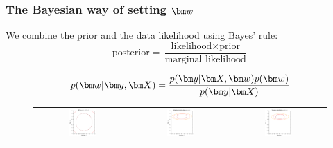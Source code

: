 \begin{frame}
\frametitle{The Bayesian way of setting $\bw$}
We combine the prior and the data likelihood using Bayes' rule:
\renewcommand\theequation{2.\thedefcounter}
\setcounter{defcounter}{5}
\begin{equation*}
\text{posterior} = \frac{\text{likelihood} \times \text{prior}}{\text{marginal likelihood}}
\end{equation*}

\begin{equation}
p(\bw|\by, \bX) = \frac{p(\by|\bX, \bw)p(\bw)}{p(\by|\bX)}
\end{equation}

\begin{figure}
\begin{tabular}{ccc}
    \includegraphics[width=0.3\textwidth]{images/plots/w_space_prior.pdf} &
    \includegraphics[width=0.3\textwidth]{images/plots/w_space_likelihood.pdf} &
    \includegraphics[width=0.3\textwidth]{images/plots/w_space_posterior.pdf} \\
\end{tabular}
\end{figure}

\end{frame}

